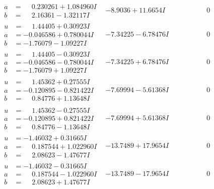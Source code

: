 \documentclass[1p]{elsarticle_modified}
\theoremstyle{definition}
\begin{document}
$$\begin{array}{c|c|c}
\begin{aligned}
a &= \phantom{-}0.230261 + 1.084960 I \\
b &= \phantom{-}2.16361 - 1.32117 I\end{aligned}
 & -8.9036 + 11.6654 I & \phantom{-0.000000 } 0 \\ \hline\begin{aligned}
u &= \phantom{-}1.44405 + 0.30923 I \\
a &= -0.046586 + 0.780044 I \\
b &= -1.76079 - 1.09227 I\end{aligned}
 & -7.34225 - 6.78476 I & \phantom{-0.000000 } 0 \\ \hline\begin{aligned}
u &= \phantom{-}1.44405 - 0.30923 I \\
a &= -0.046586 - 0.780044 I \\
b &= -1.76079 + 1.09227 I\end{aligned}
 & -7.34225 + 6.78476 I & \phantom{-0.000000 } 0 \\ \hline\begin{aligned}
u &= \phantom{-}1.45362 + 0.27555 I \\
a &= -0.120895 - 0.821422 I \\
b &= \phantom{-}0.84776 + 1.13648 I\end{aligned}
 & -7.69994 - 5.61368 I & \phantom{-0.000000 } 0 \\ \hline\begin{aligned}
u &= \phantom{-}1.45362 - 0.27555 I \\
a &= -0.120895 + 0.821422 I \\
b &= \phantom{-}0.84776 - 1.13648 I\end{aligned}
 & -7.69994 + 5.61368 I & \phantom{-0.000000 } 0 \\ \hline\begin{aligned}
u &= -1.46032 + 0.31665 I \\
a &= \phantom{-}0.187544 + 1.022960 I \\
b &= \phantom{-}2.08623 - 1.47677 I\end{aligned}
 & -13.7489 + 17.9654 I & \phantom{-0.000000 } 0 \\ \hline\begin{aligned}
u &= -1.46032 - 0.31665 I \\
a &= \phantom{-}0.187544 - 1.022960 I \\
b &= \phantom{-}2.08623 + 1.47677 I\end{aligned}
 & -13.7489 - 17.9654 I & \phantom{-0.000000 } 0 \\ \hline\begin{aligned}

\end{aligned}
\end{array}$$
\end{document}
